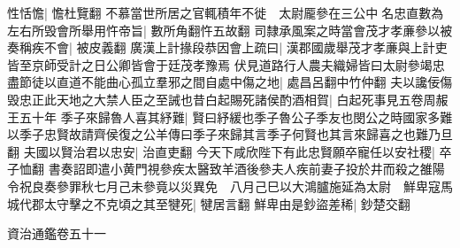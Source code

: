性恬憺|{
	憺杜覽翻}
不慕當世所居之官輒積年不徙　太尉龎參在三公中名忠直數為左右所毁會所舉用忤帝旨|{
	數所角翻忤五故翻}
司隸承風案之時當會茂才孝亷參以被奏稱疾不會|{
	被皮義翻}
廣漢上計掾段恭因會上疏曰|{
	漢郡國歲舉茂才孝亷與上計吏皆至京師受計之日公卿皆會于廷茂孝豫焉}
伏見道路行人農夫織婦皆曰太尉參竭忠盡節徒以直道不能曲心孤立羣邪之間自處中傷之地|{
	處昌呂翻中竹仲翻}
夫以讒佞傷毁忠正此天地之大禁人臣之至誡也昔白起賜死諸侯酌酒相賀|{
	白起死事見五卷周赧王五十年}
季子來歸魯人喜其紓難|{
	賢曰紓緩也季子魯公子季友也閔公之時國家多難以季子忠賢故請齊侯復之公羊傳曰季子來歸其言季子何賢也其言來歸喜之也難乃旦翻}
夫國以賢治君以忠安|{
	治直吏翻}
今天下咸欣陛下有此忠賢願卒寵任以安社稷|{
	卒子恤翻}
書奏詔即遣小黄門視參疾太醫致羊酒後參夫人疾前妻子投於井而殺之雒陽令祝良奏參罪秋七月己未參竟以災異免　八月己巳以大鴻臚施延為太尉　鮮卑寇馬城代郡太守擊之不克頃之其至犍死|{
	犍居言翻}
鮮卑由是鈔盜差稀|{
	鈔楚交翻}


資治通鑑卷五十一
